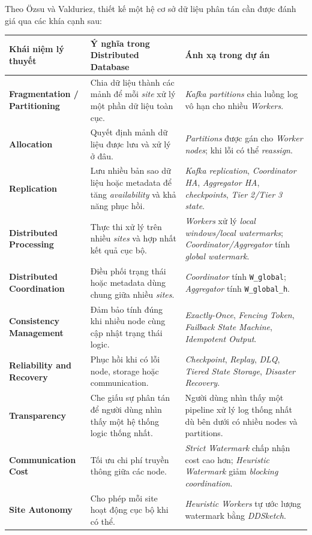 \documentclass[12pt,a4paper]{article}
\begin{document}
Theo Özsu và Valduriez, thiết kế một hệ cơ sở dữ liệu phân tán cần được đánh giá qua các khía cạnh sau:

\begin{longtable}{p{} p{} p{}}
\toprule
\textbf{Khái niệm lý thuyết} & \textbf{Ý nghĩa trong Distributed Database} & \textbf{Ánh xạ trong dự án} \\
\midrule
\endhead
\textbf{Fragmentation / Partitioning} & Chia dữ liệu thành các mảnh để mỗi \textit{site} xử lý một phần dữ liệu toàn cục. & \textit{Kafka partitions} chia luồng log vô hạn cho nhiều \textit{Workers}. \\
\textbf{Allocation} & Quyết định mảnh dữ liệu được lưu và xử lý ở đâu. & \textit{Partitions} được gán cho \textit{Worker nodes}; khi lỗi có thể \textit{reassign}. \\
\textbf{Replication} & Lưu nhiều bản sao dữ liệu hoặc metadata để tăng \textit{availability} và khả năng phục hồi. & \textit{Kafka replication}, \textit{Coordinator HA}, \textit{Aggregator HA}, \textit{checkpoints}, \textit{Tier 2/Tier 3 state}. \\
\textbf{Distributed Processing} & Thực thi xử lý trên nhiều \textit{sites} và hợp nhất kết quả cục bộ. & \textit{Workers} xử lý \textit{local windows/local watermarks}; \textit{Coordinator/Aggregator} tính \textit{global watermark}. \\
\textbf{Distributed Coordination} & Điều phối trạng thái hoặc metadata dùng chung giữa nhiều \textit{sites}. & \textit{Coordinator} tính \texttt{W\_global}; \textit{Aggregator} tính \texttt{W\_global\_h}. \\
\textbf{Consistency Management} & Đảm bảo tính đúng khi nhiều node cùng cập nhật trạng thái logic. & \textit{Exactly-Once}, \textit{Fencing Token}, \textit{Failback State Machine}, \textit{Idempotent Output}. \\
\textbf{Reliability and Recovery} & Phục hồi khi có lỗi node, storage hoặc communication. & \textit{Checkpoint}, \textit{Replay}, \textit{DLQ}, \textit{Tiered State Storage}, \textit{Disaster Recovery}. \\
\textbf{Transparency} & Che giấu sự phân tán để người dùng nhìn thấy một hệ thống logic thống nhất. & Người dùng nhìn thấy một pipeline xử lý log thống nhất dù bên dưới có nhiều nodes và partitions. \\
\textbf{Communication Cost} & Tối ưu chi phí truyền thông giữa các node. & \textit{Strict Watermark} chấp nhận cost cao hơn; \textit{Heuristic Watermark} giảm \textit{blocking coordination}. \\
\textbf{Site Autonomy} & Cho phép mỗi site hoạt động cục bộ khi có thể. & \textit{Heuristic Workers} tự ước lượng watermark bằng \textit{DDSketch}. \\
\bottomrule
\end{longtable}
\end{document}
